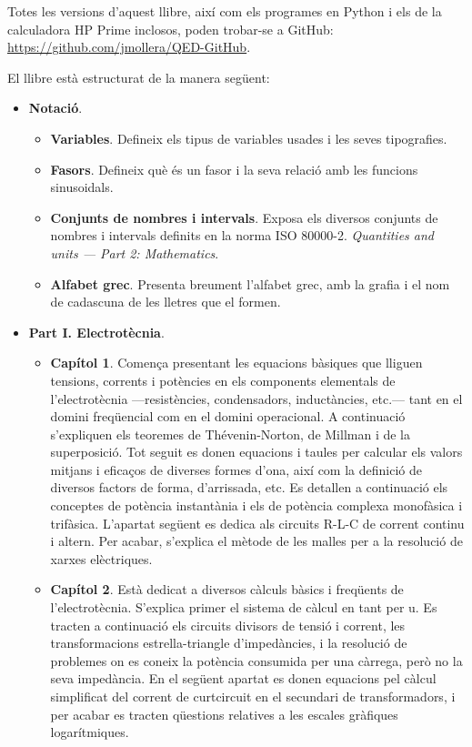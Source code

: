      Totes les versions d'aquest llibre, així com els programes en Python i els de la calculadora \textsf{HP Prime} inclosos, poden trobar-se a GitHub: \href{https://github.com/jmollera/QED-GitHub}{https:/\!\!/github.com/jmollera/QED-GitHub}.

	El llibre està estructurat de la manera següent:
	\begin{itemize}
		\item \textbf{Notació}.
		\begin{itemize}
			\item \textbf{Variables}. Defineix els tipus de variables usades i les seves tipografies.
			\item \textbf{Fasors}. Defineix què és un fasor i la seva relació amb les funcions sinusoidals.
			\item \textbf{Conjunts de nombres i intervals}. Exposa  els diversos conjunts de nombres i  intervals definits en la norma ISO 80000-2.
			\textit{Quantities and units --- Part 2: Mathematics}.
			\item \textbf{Alfabet grec}.  Presenta breument l'alfabet grec, amb la grafia i el nom de cadascuna de les lletres que el formen.
		\end{itemize}
		\item \textbf{Part I. Electrotècnia}. 
		\begin{itemize}
			\item \textbf{Capítol 1}. Comença presentant les equacions bàsiques que lliguen tensions, corrents i potències en els components elementals de l'electrotècnia ---resistències, condensadors, inductàncies, etc.--- tant en el domini freqüencial com en el domini operacional. A continuació s'expliquen els teoremes de Thévenin-Norton, de Millman i de la superposició. Tot seguit es donen equacions i taules per calcular els valors mitjans i eficaços de diverses formes d'ona, així com la definició de diversos factors de forma, d'arrissada, etc. Es detallen a continuació els conceptes de potència instantània i els de potència complexa monofàsica i trifàsica. L'apartat següent es dedica  als circuits R-L-C de corrent continu i altern. Per acabar, s'explica el mètode de les malles per a la resolució de xarxes elèctriques.
			\item \textbf{Capítol 2}. Està dedicat a diversos càlculs bàsics i freqüents de l'electrotècnia. S'explica primer el sistema de càlcul en tant per u. Es tracten a continuació els circuits  divisors de tensió i corrent,  les transformacions estrella-triangle d'impedàncies, i la resolució de problemes on es coneix la potència consumida per una càrrega, però no la seva impedància. En el següent apartat es donen equacions pel càlcul simplificat del corrent de curtcircuit en el secundari de transformadors, i per acabar es tracten  qüestions relatives a les  escales gràfiques logarítmiques.

\end{itemize}
\end{itemize}
